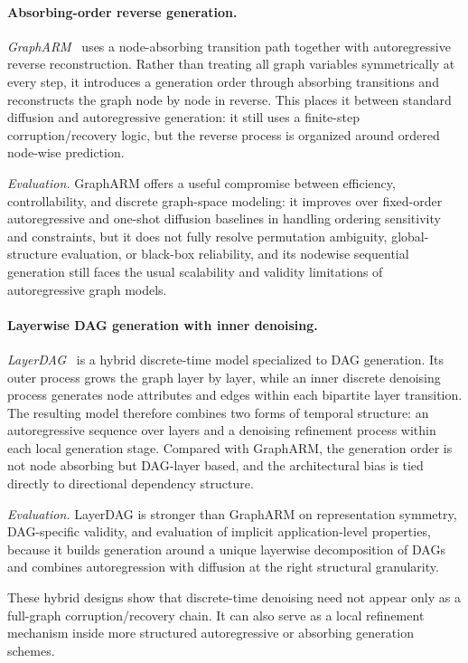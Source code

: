 \documentclass{article}
\begin{document}
\paragraph{Absorbing-order reverse generation.}
\emph{GraphARM}~\cite{kongautoregressive} uses a node-absorbing transition path together with autoregressive reverse reconstruction. Rather than treating all graph variables symmetrically at every step, it introduces a generation order through absorbing transitions and reconstructs the graph node by node in reverse. This places it between standard diffusion and autoregressive generation: it still uses a finite-step corruption/recovery logic, but the reverse process is organized around ordered node-wise prediction.

\emph{Evaluation.} GraphARM offers a useful compromise between efficiency, controllability, and discrete graph-space modeling: it improves over fixed-order autoregressive and one-shot diffusion baselines in handling ordering sensitivity and constraints, but it does not fully resolve permutation ambiguity, global-structure evaluation, or black-box reliability, and its nodewise sequential generation still faces the usual scalability and validity limitations of autoregressive graph models.

\paragraph{Layerwise DAG generation with inner denoising.}
\emph{LayerDAG}~\cite{li2024layerdag} is a hybrid discrete-time model specialized to DAG generation. Its outer process grows the graph layer by layer, while an inner discrete denoising process generates node attributes and edges within each bipartite layer transition. The resulting model therefore combines two forms of temporal structure: an autoregressive sequence over layers and a denoising refinement process within each local generation stage. Compared with GraphARM, the generation order is not node absorbing but DAG-layer based, and the architectural bias is tied directly to directional dependency structure.

\emph{Evaluation.} LayerDAG is stronger than GraphARM on representation symmetry, DAG-specific validity, and evaluation of implicit application-level properties, because it builds generation around a unique layerwise decomposition of DAGs and combines autoregression with diffusion at the right structural granularity.

These hybrid designs show that discrete-time denoising need not appear only as a full-graph corruption/recovery chain. It can also serve as a local refinement mechanism inside more structured autoregressive or absorbing generation schemes.
\end{document}
